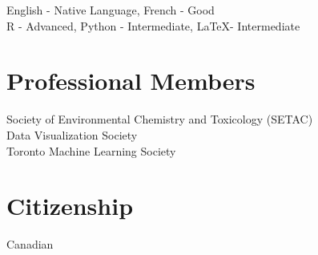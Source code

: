 \documentclass[margin,line]{res}
\begin{document}
\begin{resume}
English - Native Language, French - Good\\
R - Advanced, Python - Intermediate, LaTeX- Intermediate

\vspace*{.1in}

\section{\sc Professional Members}
Society of Environmental Chemistry and Toxicology (SETAC)
\\
Data Visualization Society
\\
Toronto Machine Learning Society

\vspace*{.1in}

\section{\sc Citizenship}
Canadian

\end{resume}
\end{document}
